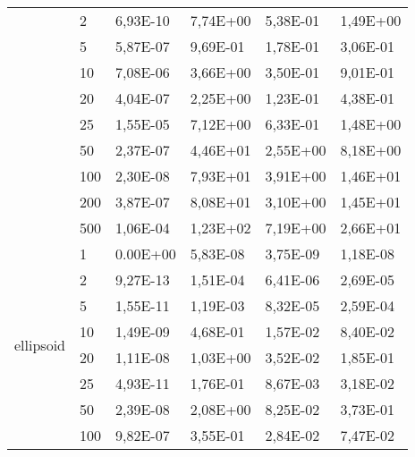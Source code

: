 \begin{longtable}[c]{|m{3.5cm}|l|l|l|l|l|}
                                        & 2         & 6,93E-10   & 7,74E+00   & 5,38E-01   & 1,49E+00  \\ \cline{2-6} 
                                        & 5         & 5,87E-07   & 9,69E-01   & 1,78E-01   & 3,06E-01  \\ \cline{2-6} 
                                        & 10        & 7,08E-06   & 3,66E+00   & 3,50E-01   & 9,01E-01  \\ \cline{2-6} 
                                        & 20        & 4,04E-07   & 2,25E+00   & 1,23E-01   & 4,38E-01  \\ \cline{2-6} 
                                        & 25        & 1,55E-05   & 7,12E+00   & 6,33E-01   & 1,48E+00  \\ \cline{2-6} 
                                        & 50        & 2,37E-07   & 4,46E+01   & 2,55E+00   & 8,18E+00  \\ \cline{2-6} 
                                        & 100       & 2,30E-08   & 7,93E+01   & 3,91E+00   & 1,46E+01  \\ \cline{2-6} 
                                        & 200       & 3,87E-07   & 8,08E+01   & 3,10E+00   & 1,45E+01  \\ \cline{2-6} 
                                        & 500       & 1,06E-04   & 1,23E+02   & 7,19E+00   & 2,66E+01  \\ \hline
\multirow{10}{*}{ellipsoid}             & 1         & 0.00E+00   & 5,83E-08   & 3,75E-09   & 1,18E-08  \\ \cline{2-6} 
                                        & 2         & 9,27E-13   & 1,51E-04   & 6,41E-06   & 2,69E-05  \\ \cline{2-6} 
                                        & 5         & 1,55E-11   & 1,19E-03   & 8,32E-05   & 2,59E-04  \\ \cline{2-6} 
                                        & 10        & 1,49E-09   & 4,68E-01   & 1,57E-02   & 8,40E-02  \\ \cline{2-6} 
                                        & 20        & 1,11E-08   & 1,03E+00   & 3,52E-02   & 1,85E-01  \\ \cline{2-6} 
                                        & 25        & 4,93E-11   & 1,76E-01   & 8,67E-03   & 3,18E-02  \\ \cline{2-6} 
                                        & 50        & 2,39E-08   & 2,08E+00   & 8,25E-02   & 3,73E-01  \\ \cline{2-6} 
                                        & 100       & 9,82E-07   & 3,55E-01   & 2,84E-02   & 7,47E-02  \\ \cline{2-6} 

\end{longtable}
